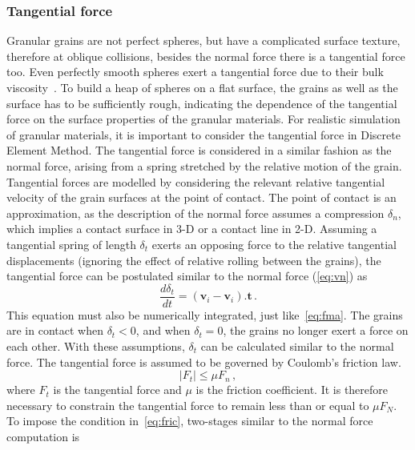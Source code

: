 \subsubsection*{Tangential force}
Granular grains are not perfect spheres, but have a complicated surface 
texture, therefore at oblique collisions, besides the normal force there is a 
tangential force too. Even perfectly smooth spheres exert a tangential force 
due to their bulk viscosity~\citep{Poschel2005}. To build a heap of 
spheres on a flat surface, the grains as well as the surface has to be 
sufficiently rough, indicating the dependence of the tangential force on the 
surface properties of the granular materials. For realistic simulation of 
granular materials, it is important to consider the tangential force in 
Discrete Element Method. The tangential force is considered in a similar 
fashion as the normal force, arising from a spring stretched by the relative 
motion of the grain. Tangential forces are modelled by considering the relevant 
relative tangential velocity of the grain surfaces at the point of contact. The 
point of contact is an approximation, as the description of the normal force 
assumes a compression $\delta_{n}$, which implies a contact surface in 3-D or a 
contact line in 2-D. Assuming a tangential spring of length $\delta_{t}$ exerts 
an opposing force to the relative tangential displacements (ignoring the effect 
of relative rolling between the grains), the tangential force can be postulated 
similar to the normal force (\cref{eq:vn}) as
%
\begin{equation}
\label{eq:vt}
\frac{d{\delta_{t}}}{dt}=(\mathbf{v}_{\mathit{i}}-\mathbf{v}_{\mathit{i}}).{\mathbf{t}}
 \,.
\end{equation}
%
This equation must also be numerically integrated, just like~\cref{eq:fma}. The 
grains are in contact when $\delta_{t}<0$, and when $\delta_{t}=0$, the grains 
no longer exert a force on each other. With these assumptions, $\delta_{t}$ can 
be calculated similar to the normal force. The tangential force is assumed to 
be governed by Coulomb's friction law.
%
\begin{equation}
\left|F_{\mathit{t}}\right|\le\mu F_{\mathit{n}} \,, \label{eq:fric}
\end{equation}
%
where $F_{\mathit{t}}$ is the tangential force and $\mu$ is the friction 
coefficient. It is therefore necessary to constrain the tangential force to 
remain less than or equal to $\mu F_{N}$. To impose the condition 
in~\cref{eq:fric}, two-stages similar to the normal force computation is 
